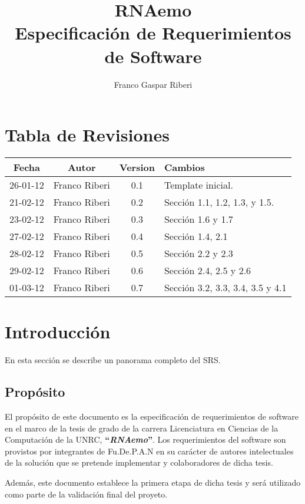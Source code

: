 \documentclass[10pt,a4paper,english,spanish]{article}
\title{\textbf{RNAemo}\\ \vspace{0.45cm} Especificación de Requerimientos de Software} %
\author{Franco Gaspar Riberi}
\newcommand{\rnaemo}{\textbf{\emph{RNAemo}}}
\begin{document}
\maketitle\pagebreak{}\tableofcontents{}\pagebreak{}

\section*{Tabla de Revisiones}
	
\begin{center}
\begin{tabular}{| c | c | c | l |}
	\hline
	{\bf Fecha} & {\bf Autor} & {\bf Version} & {\bf Cambios}\\
	\hline
	\hline		
	26-01-12 & Franco Riberi & 0.1 & Template inicial.\\\hline
	21-02-12 & Franco Riberi & 0.2 & Sección 1.1, 1.2, 1.3,  y 1.5.\\\hline
	23-02-12 & Franco Riberi & 0.3 & Sección 1.6 y 1.7\\\hline
	27-02-12 & Franco Riberi & 0.4 & Sección 1.4, 2.1 \\\hline
	28-02-12 & Franco Riberi & 0.5 & Sección 2.2 y 2.3 \\\hline
	29-02-12 & Franco Riberi & 0.6 & Sección 2.4, 2.5 y 2.6 \\\hline
	01-03-12 & Franco Riberi & 0.7 & Sección 3.2, 3.3, 3.4, 3.5 y 4.1 \\\hline
\end{tabular}
\end{center}
\newpage

\section{Introducción}
En esta sección se describe un panorama completo del SRS.

\subsection{Propósito}
\par El propósito de este documento es la especificación de requerimientos
de software en el marco de la tesis de grado de la carrera Licenciatura en
Ciencias de la Computación de la UNRC, \textbf{``}\rnaemo\textbf{''}.  Los requerimientos 
del software son provistos por integrantes de Fu.De.P.A.N en su carácter de autores
intelectuales de la solución que se pretende implementar y colaboradores
de dicha tesis.
\par Además, este documento establece la primera etapa de dicha tesis y será utilizado
como parte de la validación final del proyeto.
\end{document}

